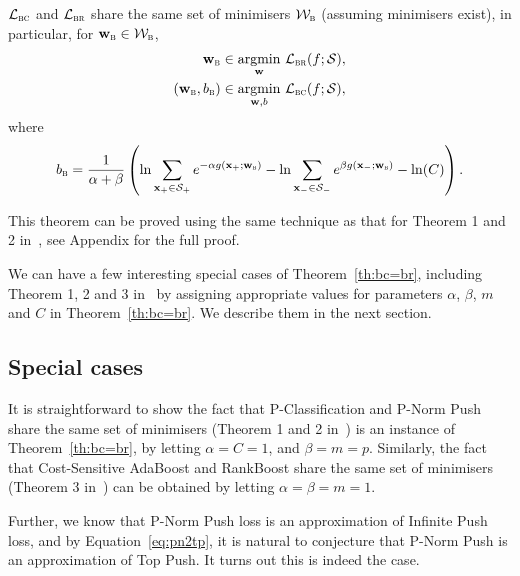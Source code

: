 \begin{theorem}
\label{th:bc=br}
$\mathcal{L}_\textsc{bc}$ and $\mathcal{L}_\textsc{br}$ share the same set of minimisers $\mathcal{W}_\textsc{b}$
(assuming minimisers exist), in particular, for $\mathbf{w}_\textsc{b} \in \mathcal{W}_\textsc{b}$,
\begin{equation*}
\begin{aligned}
                \mathbf{w}_\textsc{b} & \in \operatorname*{argmin}_{\mathbf{w}}     \, \mathcal{L}_\textsc{br}(f; \mathcal{S}), \\
(\mathbf{w}_\textsc{b}, b_\textsc{b}) & \in \operatorname*{argmin}_{\mathbf{w},b} \, \mathcal{L}_\textsc{bc}(f; \mathcal{S}),
\end{aligned}
\end{equation*}
where
$$
\displaystyle
b_\textsc{b} 
= \frac{1}{\alpha + \beta} \left( 
  \ln \sum_{\mathbf{x}_+ \in \mathcal{S}_+} e^{-\alpha g(\mathbf{x}_+; \mathbf{w}_\textsc{b})} -
  \ln \sum_{\mathbf{x}_- \in \mathcal{S}_-} e^{  \beta g(\mathbf{x}_-; \mathbf{w}_\textsc{b})} - \ln(C) \right).
$$
\end{theorem}

This theorem can be proved using the same technique as that for Theorem 1 and 2 in~\cite{ertekin2011equivalence},
see Appendix for the full proof.

We can have a few interesting special cases of Theorem~\ref{th:bc=br},
including Theorem 1, 2 and 3 in~\cite{ertekin2011equivalence} by 
assigning appropriate values for parameters $\alpha$, $\beta$, $m$ and $C$ in Theorem~\ref{th:bc=br}.
We describe them in the next section.




\subsection{Special cases}

It is straightforward to show the fact that P-Classification and P-Norm Push share the same set of minimisers 
(Theorem 1 and 2 in~\cite{ertekin2011equivalence}) is an instance of Theorem~\ref{th:bc=br}, by letting $\alpha = C = 1$, and $\beta = m = p$.
Similarly, the fact that Cost-Sensitive AdaBoost and RankBoost share the same set of minimisers (Theorem 3 in~\cite{ertekin2011equivalence}) 
can be obtained by letting $\alpha = \beta = m = 1$.

Further, we know that P-Norm Push loss is an approximation of Infinite Push loss, and by Equation~\ref{eq:pn2tp}, 
it is natural to conjecture that P-Norm Push is an approximation of Top Push.
It turns out this is indeed the case.

